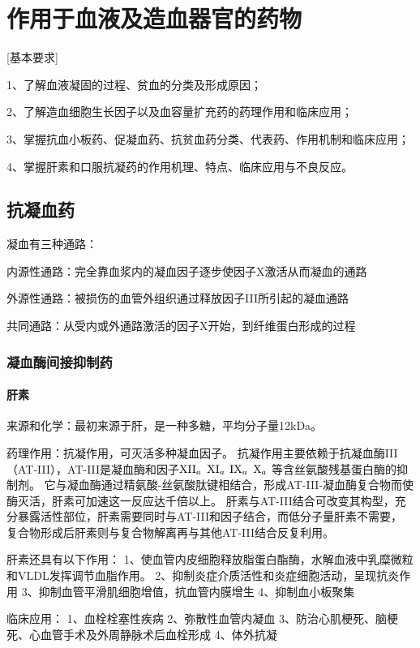 \documentclass[UTF8]{ctexbook}
\begin{document}
\chapter{作用于血液及造血器官的药物}
[基本要求]

1、了解血液凝固的过程、贫血的分类及形成原因；

2、了解造血细胞生长因子以及血容量扩充药的药理作用和临床应用；

3、掌握抗血小板药、促凝血药、抗贫血药分类、代表药、作用机制和临床应用；

4、掌握肝素和口服抗凝药的作用机理、特点、临床应用与不良反应。
\section{抗凝血药}
凝血有三种通路：

内源性通路：完全靠血浆内的凝血因子逐步使因子X激活从而凝血的通路

外源性通路：被损伤的血管外组织通过释放因子III所引起的凝血通路

共同通路：从受内或外通路激活的因子X开始，到纤维蛋白形成的过程

\subsection{凝血酶间接抑制药}
\subsubsection{肝素}

来源和化学：最初来源于肝，是一种多糖，平均分子量12kDa。

药理作用：抗凝作用，可灭活多种凝血因子。
抗凝作用主要依赖于抗凝血酶III（AT-III），AT-III是凝血酶和因子\( \textup{XII}_{a}\) \(\textup{XI}_{a}\) \(\textup{IX}_{a}\) \(\textup{X}_{a} \)
等含丝氨酸残基蛋白酶的抑制剂。
它与凝血酶通过精氨酸-丝氨酸肽键相结合，形成AT-III-凝血酶复合物而使酶灭活，肝素可加速这一反应达千倍以上。
肝素与AT-III结合可改变其构型，充分暴露活性部位，肝素需要同时与AT-III和因子结合，而低分子量肝素不需要，
复合物形成后肝素则与复合物解离再与其他AT-III结合反复利用。

肝素还具有以下作用：
1、使血管内皮细胞释放脂蛋白酯酶，水解血液中乳糜微粒和VLDL发挥调节血脂作用。
2、抑制炎症介质活性和炎症细胞活动，呈现抗炎作用
3、抑制血管平滑肌细胞增值，抗血管内膜增生
4、抑制血小板聚集

临床应用：
1、血栓栓塞性疾病
2、弥散性血管内凝血
3、防治心肌梗死、脑梗死、心血管手术及外周静脉术后血栓形成
4、体外抗凝
\end{document}
